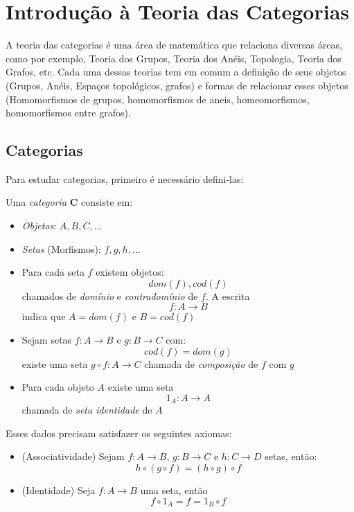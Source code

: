 \documentclass[../main.tex]{subfiles}
\begin{document}
\section{Introdução à Teoria das Categorias}

A teoria das categorias é uma área de matemática que relaciona diversas áreas, como por exemplo, Teoria dos Grupos, Teoria dos Anéis, Topologia, Teoria dos Grafos, etc. Cada uma dessas teorias tem em comum a definição de seus objetos (Grupos, Anéis, Espaços topológicos, grafos) e formas de relacionar esses objetos (Homomorfismos de grupos, homomorfismos de aneis, homeomorfismos, homomorfismos entre grafos). 

\subsection{Categorias}

Para estudar categorias, primeiro é necessário defini-las:

\begin{definition}
    Uma \emph{categoria} $\mathbf{C}$ consiste em:
    \begin{itemize}
        \item \emph{Objetos}: $A, B, C, \dots$
        \item \emph{Setas} (Morfismos): $f, g, h, \dots$
        \item Para cada seta $f$ existem objetos: $$dom(f), cod(f)$$ chamados de \emph{domínio} e \emph{contradomínio} de $f$. A escrita $$f : A \to B$$ indica que $A = dom(f)$ e $B = cod(f)$
        \item Sejam setas $f : A \to B$ e $g : B \to C$ com: $$cod(f) = dom(g)$$ existe uma seta $g \circ f : A \to C$ chamada de \emph{composição} de $f$ com $g$
        \item Para cada objeto $A$ existe uma seta $$1_A : A \to A$$ chamada de \emph{seta identidade} de $A$
    \end{itemize}
    Esses dados precisam satisfazer os seguintes axiomas:
    \begin{itemize}
        \item (Associatividade) Sejam $f : A \to B$, $g : B \to C$ e $h : C \to D$ setas, então: $$h \circ (g \circ f) = (h \circ g ) \circ f$$
        \item (Identidade) Seja $f : A \to B$ uma seta, então $$f \circ 1_A = f = 1_B \circ f$$
    \end{itemize}
\end{definition}
\end{document}
